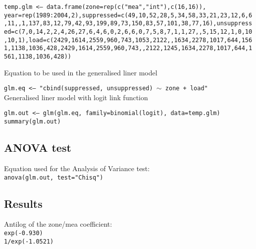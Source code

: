 \begin{spacing}{1.5}
\noindent \texttt{temp.glm <-- data.frame(zone=rep(c("mea","int"),c(16,16)), year=rep\linebreak (1989:2004,2),suppressed=c(49,10,52,28,5,34,58,33,21,23,12,6,6,11,,1,137,83,12,79,42,93,199,89,73,150,83,57,101,38,77,16),\linebreak unsuppressed=c(7,0,14,2,2,4,26,27,6,4,6,0,2,6,6,0,7,5,8,7,1,1,27,,5,15,12,1,0,10,10,1),load=c(2429,1614,2559,960,743,1053,2122,,1634,2278,1017,644,1561,1138,1036,428,2429,1614,2559,960,743,,2122,1245,1634,2278,1017,644,1561,1138,1036,428))} \\

\clearpage

\noindent Equation to be used in the generalised liner model

\noindent \texttt{glm.eq <-- "cbind(suppressed, unsuppressed) $\sim$ zone + load"} \\

\noindent Generalised liner model with logit link function

\noindent \texttt{glm.out <-- glm(glm.eq, family=binomial(logit), data=temp.glm)} \\

\noindent \texttt{summary(glm.out)}

\subsection{ANOVA test}
Equation used for the Analysis of Variance test: \\

\noindent \texttt{anova(glm.out, test="Chisq")}

\subsection{Results}
Antilog of the zone/mea coefficient: \\

\noindent \texttt{exp(-0.930)} \\       

\noindent \texttt{1/exp(-1.0521)} 



\end{spacing}
\clearpage
